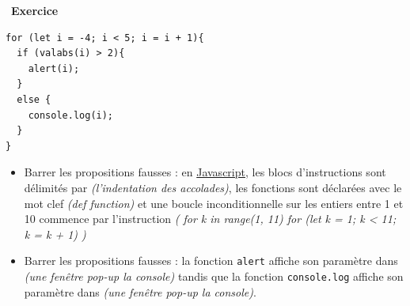\documentclass[
  11pt,
]{article}
\newcommand{\passthrough}[1]{#1}
\providecommand{\tightlist}{%
  \setlength{\itemsep}{0pt}\setlength{\parskip}{0pt}}
\newcounter{exo}
\newenvironment{exercice}[1]
{\par \medskip   \addtocounter{exo}{1} \noindent  
\begin{bclogo}[arrondi =0.1,   noborder = true, logo=\bccrayon, marge=4]{~\textbf{Exercice} \textbf{\theexo} {\itshape #1} }  \par}
{
\end{bclogo}
 \par \bigskip }
\newcounter{prop}
\newcounter{def}
\begin{document}
\begin{exercice}{}
\begin{lstlisting}
for (let i = -4; i < 5; i = i + 1){
  if (valabs(i) > 2){
    alert(i);
  }
  else {
    console.log(i);
  }
}
\end{lstlisting}

\begin{itemize}
\tightlist
\item
  Barrer les propositions fausses : en
  \href{https://developer.mozilla.org/fr/docs/Glossaire/JavaScript}{Javascript},
  les blocs d'instructions sont délimités par \emph{(l'indentation
  \textbar{} des accolades)}, les fonctions sont déclarées avec le mot
  clef \emph{(def \textbar{} function)} et une boucle inconditionnelle
  sur les entiers entre 1 et 10 commence par l'instruction \emph{( for k
  in range(1, 11) \textbar{} for (let k = 1; k \textless{} 11; k = k +
  1) )}
\item
  Barrer les propositions fausses : la fonction
  \passthrough{\lstinline!alert!} affiche son paramètre dans \emph{(une
  fenêtre pop-up \textbar{} la console)} tandis que la fonction
  \passthrough{\lstinline!console.log!} affiche son paramètre dans
  \emph{(une fenêtre pop-up \textbar{} la console)}.
\end{itemize}

\end{exercice}
\end{document}
